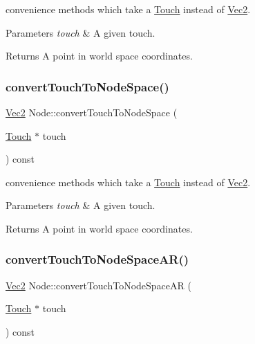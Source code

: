 convenience methods which take a \hyperlink{classTouch}{Touch} instead of \hyperlink{classVec2}{Vec2}.


\begin{DoxyParams}{Parameters}
{\em touch} & A given touch. \\
\hline
\end{DoxyParams}
\begin{DoxyReturn}{Returns}
A point in world space coordinates. 
\end{DoxyReturn}
\mbox{\label{classNode_a6ff92b98917dbaea150b90b578a84fca}} 
\subsubsection{\texorpdfstring{convert\+Touch\+To\+Node\+Space()}{convertTouchToNodeSpace()}\hspace{0.1cm}{\footnotesize\ttfamily [2/2]}}
{\footnotesize\ttfamily \hyperlink{classVec2}{Vec2} Node\+::convert\+Touch\+To\+Node\+Space (\begin{DoxyParamCaption}\item[{\hyperlink{classTouch}{Touch} $\ast$}]{touch }\end{DoxyParamCaption}) const}

convenience methods which take a \hyperlink{classTouch}{Touch} instead of \hyperlink{classVec2}{Vec2}.


\begin{DoxyParams}{Parameters}
{\em touch} & A given touch. \\
\hline
\end{DoxyParams}
\begin{DoxyReturn}{Returns}
A point in world space coordinates. 
\end{DoxyReturn}
\mbox{\label{classNode_af9a987bf0d6590367c254e78426773af}} 
\subsubsection{\texorpdfstring{convert\+Touch\+To\+Node\+Space\+A\+R()}{convertTouchToNodeSpaceAR()}\hspace{0.1cm}{\footnotesize\ttfamily [1/2]}}
{\footnotesize\ttfamily \hyperlink{classVec2}{Vec2} Node\+::convert\+Touch\+To\+Node\+Space\+AR (\begin{DoxyParamCaption}\item[{\hyperlink{classTouch}{Touch} $\ast$}]{touch }\end{DoxyParamCaption}) const}

